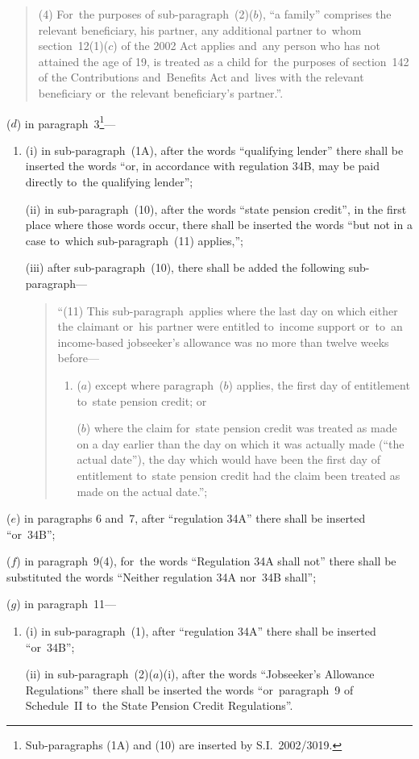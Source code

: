 \documentclass[12pt,a4paper]{article}
\begin{document}
\begin{enumerate}
\begin{quotation}
(4) For~the purposes of sub-paragraph~(2)($b$), “a family” comprises the relevant beneficiary, his partner, any additional partner to~whom section~12(1)($c$)  of the 2002 Act applies and~any person who has not attained the age of 19, is treated as a child for~the purposes of section~142 of the Contributions and~Benefits Act and~lives with the relevant beneficiary or~the relevant beneficiary’s partner.”.
\end{quotation}

($d$) in paragraph~3\footnote{Sub-paragraphs (1A) and (10) are inserted by S.I.~2002/3019.}—
\begin{enumerate}\item[]
(i) in sub-paragraph~(1A), after the words “qualifying lender” there shall be inserted the words “or, in accordance with regulation 34B, may be paid directly to~the qualifying lender”;

(ii) in sub-paragraph~(10), after the words “state pension credit”, in the first place where those words occur, there shall be inserted the words “but not in a case to~which sub-paragraph~(11) applies,”;

(iii) after sub-paragraph~(10), there shall be added the following sub-paragraph—
\begin{quotation}
“(11) This sub-paragraph~applies where the last day on which either the claimant or~his partner were entitled to~income support or~to~an income-based jobseeker’s allowance was no more than twelve weeks before—
\begin{enumerate}\item[]
($a$) except where paragraph~($b$)  applies, the first day of entitlement to~state pension credit; or

($b$) where the claim for~state pension credit was treated as made on a day earlier than the day on which it was actually made (“the actual date”), the day which would have been the first day of entitlement to~state pension credit had the claim been treated as made on the actual date.”;
\end{enumerate}
\end{quotation}
\end{enumerate}

($e$) in paragraphs 6 and~7, after “regulation 34A” there shall be inserted “or~34B”;

($f$) in paragraph~9(4), for~the words “Regulation 34A shall not” there shall be substituted the words “Neither regulation 34A nor~34B shall”;

($g$) in paragraph~11—
\begin{enumerate}\item[]
(i) in sub-paragraph~(1), after “regulation 34A” there shall be inserted “or~34B”;

(ii) in sub-paragraph~(2)($a$)(i), after the words “Jobseeker’s Allowance Regulations” there shall be inserted the words “or~paragraph~9 of Schedule~II to~the State Pension Credit Regulations”.
\end{enumerate}
\end{enumerate}
\end{document}
